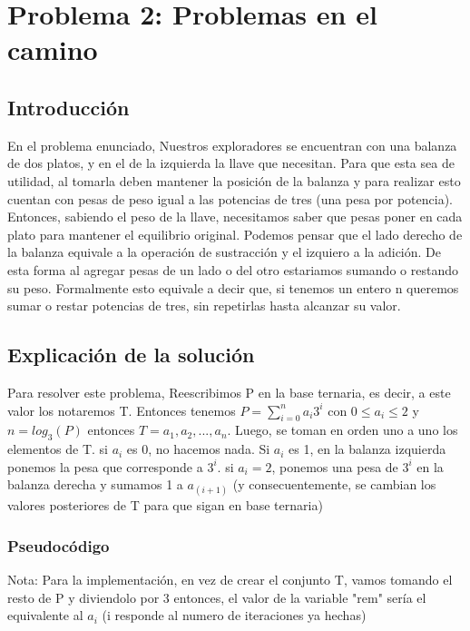 \documentclass[spanish,12pt]{article}
\begin{document}
\section{Problema 2: Problemas en el camino}

\subsection{Introducción}

En el problema enunciado, Nuestros exploradores se encuentran con una balanza de dos platos, y en el de la izquierda la llave que necesitan. Para que esta sea de utilidad, al tomarla deben mantener la posición de la balanza y para realizar esto cuentan con pesas de peso igual a las potencias de tres (una pesa por potencia).
Entonces, sabiendo el peso de la llave, necesitamos saber que pesas poner en cada plato para mantener el equilibrio original.
Podemos pensar que el lado derecho de la balanza equivale a la operación de sustracción y el izquiero a la adición. De esta forma al agregar pesas de un lado o del otro estariamos sumando o restando su peso.
Formalmente esto equivale a decir que, si tenemos un entero n queremos sumar o restar potencias de tres, sin repetirlas hasta alcanzar su valor.

\subsection{Explicación de la solución}

Para resolver este problema, Reescribimos P en la base ternaria, es decir, a este valor los notaremos T. Entonces tenemos $P = \sum_{i=0}^{n} a_i3^i$  con $0 \leq a_i \leq 2$ y $n = log_{3}{(P)}$  entonces $T ={a_1,a_2,...,a_n}$.
Luego, se toman en orden uno a uno los elementos de T. si $a_i$ es 0, no hacemos nada. Si $a_i$ es 1, en la balanza izquierda ponemos la pesa que corresponde a $3^i$. si $a_i =2$, ponemos una pesa de $3^i$ en la balanza derecha y sumamos 1 a $a_{(i+1)}$ (y consecuentemente, se cambian los valores posteriores de T para que sigan en base ternaria)


\subsubsection{Pseudocódigo}

Nota: Para la implementación, en vez de crear el conjunto T, vamos tomando el resto de P y diviendolo por 3 entonces, el valor de la variable "rem" sería el equivalente al $a_i$ (i responde al numero de iteraciones ya hechas)
\end{document}
